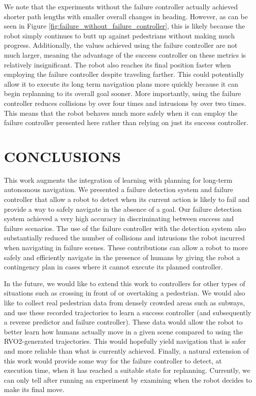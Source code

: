 \documentclass[letterpaper, 10 pt, conference]{ieeeconf}  %
\begin{document}
	We note that the experiments without the failure controller actually achieved shorter path lengths with smaller overall changes in heading. However, as can be seen in Figure \ref{fig:failure_without_failure_controller}, this is likely because the robot simply continues to butt up against pedestrians without making much progress. Additionally, the values achieved using the failure controller are not much larger, meaning the advantage of the success controller on these metrics is relatively insignificant. The robot also reaches its final position faster when employing the failure controller despite traveling farther. This could potentially allow it to execute its long term navigation plans more quickly because it can begin replanning to its overall goal sooner. More importantly, using the failure controller reduces collisions by over four times and intrusions by over two times. This means that the robot behaves much more safely when it can employ the failure controller presented here rather than relying on just its success controller. 

\section{CONCLUSIONS}\label{sec:conclusion}

	This work augments the integration of learning with planning for long-term autonomous navigation. We presented a failure detection system and failure controller that allow a robot to detect when its current action is likely to fail and provide a way to safely navigate in the absence of a goal. Our failure detection system achieved a very high accuracy in discriminating between success and failure scenarios. The use of the failure controller with the detection system also substantially reduced the number of collisions and intrusions the robot incurred when navigating in failure scenes. These contributions can allow a robot to more safely and efficiently navigate in the presence of humans by giving the robot a contingency plan in cases where it cannot execute its planned controller.
	
	In the future, we would like to extend this work to controllers for other types of situations such as crossing in front of or overtaking a pedestrian. We would also like to collect real pedestrian data from densely crowded areas such as subways, and use these recorded trajectories to learn a success controller (and subsequently a reverse predictor and failure controller). These data would allow the robot to better learn how humans actually move in a given scene compared to using the RVO2-generated trajectories. This would hopefully yield navigation that is safer and more reliable than what is currently achieved. Finally, a natural extension of this work would provide some way for the failure controller to detect, at execution time, when it has reached a suitable state for replanning. Currently, we can only tell after running an experiment by examining when the robot decides to make its final move.
\end{document}
